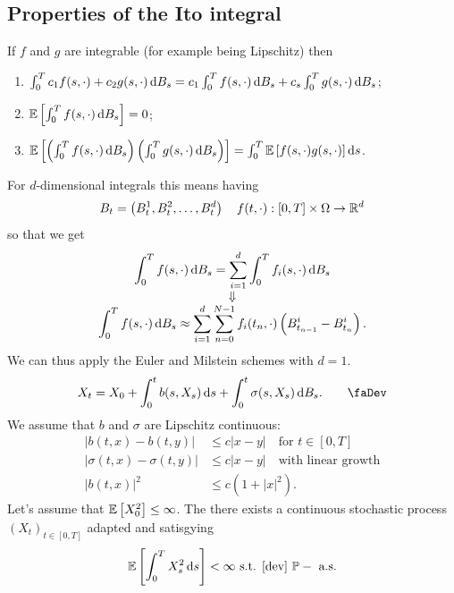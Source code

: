 \documentclass[12pt]{report}
\begin{document}
\subsection{Properties of the Ito integral}
\begin{theorem}
	If $f$ and $g$ are integrable (for example being Lipschitz) then
	\begin{enumerate}[\circnum]
		\item $\int_{0}^{T}c_1f(s,\cdot)+c_2g(s,\cdot)\mathop{}\!\mathrm{d} B_s=c_1\int_{0}^{T}f(s,\cdot)\mathop{}\!\mathrm{d} B_s+c_s\int_{0}^{T}g(s,\cdot)\mathop{}\!\mathrm{d} B_s$;
		\item $\mathbb{E}\left[\int_{0}^{T}f(s,\cdot)\mathop{}\!\mathrm{d} B_s\right]=0$;
		\item $\mathbb{E}\left[\left(\int_{0}^{T}f(s,\cdot)\mathop{}\!\mathrm{d} B_s\right)\left(\int_{0}^{T}g(s,\cdot)\mathop{}\!\mathrm{d} B_s\right)\right]=\int_{0}^{T}\mathbb{E}\left[f(s,\cdot)g(s,\cdot)\right]\mathop{}\!\mathrm{d} s$.
	\end{enumerate}
\end{theorem}
For $d$-dimensional integrals this means having
\begin{equation*}
	B_t=\left(B_t^1,B_t^2,\ldots,B_t^d\right)\quad f(t,\cdot):[0,T]\times\Omega\to\mathbb{R}^{d}
\end{equation*}
so that we get
\begin{equation*}
	\begin{array}{>{\displaystyle}c}
		\int_0^Tf(s,\cdot)\dif B_s=\sum_{i=1}^{d}\int_{0}^{T}f_i(s,\cdot)\dif B_s\\
		\Downarrow\\
		\int_0^Tf(s,\cdot)\dif B_s\approx\sum_{i=1}^{d}\sum_{n=0}^{N-1}f_i(t_n,\cdot)\left(B_{t_{n-1}}^{i}-B_{t_{n}}^{i}\right).
	\end{array}
\end{equation*}
We can thus apply the Euler and Milstein schemes with $d=1$.
\begin{equation*}
	X_t=X_0+\int_{0}^{t}b(s,X_s)\ds+\int_{0}^{t}\sigma(s,X_s)\dif B_s.\tag*{\faDev}\label{dev}
\end{equation*}
We assume that $b$ and $\sigma$ are Lipschitz continuous:
\begin{align*}
	|b(t,x)-b(t,y)|&\leq c|x-y|\quad\text{for }t\in[0,T]\\
	|\sigma(t,x)-\sigma(t,y)|&\leq c|x-y|\quad\text{with linear growth}\\
	|b(t,x)|^{2}&\leq c(1+|x|^{2}).
\end{align*}
Let's assume that $\mathbb{E}\left[X^{2}_{0}\right]\leq\infty$. The there exists a continuous stochastic process ${(X_{t})}_{t\in[0,T]}$ adapted and satisgying 
\begin{equation*}
	\mathbb{E}\left[\int_{0}^{T}X^{2}_{s}\mathop{}\!\mathrm{d} s\right]<\infty\text{ s.t. \ref{dev} }\mathbb{P}-\text{ a.s.}{}
\end{equation*}
\end{document}
